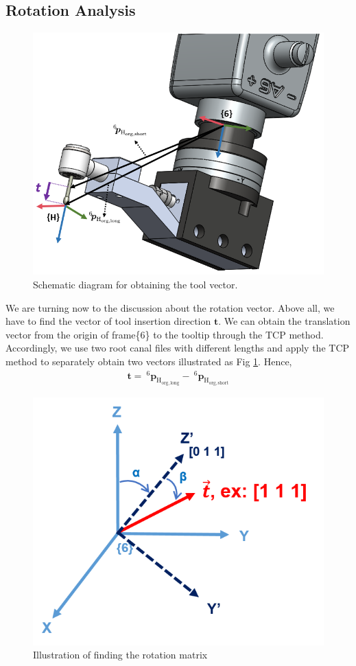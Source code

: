 \subsection{Rotation Analysis}
\label{sec:rot inf}
\begin{figure}[htbp]
\begin{center}
\includegraphics[width=0.7\linewidth]{Images/TCP2.png}
\caption{ 
Schematic diagram for obtaining the tool vector. 
}\label{fig:tcp2}
\end{center}
\end{figure}
\hspace*{6mm}We are turning now to the discussion about the rotation vector. Above all, we have to find the vector of tool insertion direction $\boldsymbol{t}$. We can obtain the translation vector from the origin of frame\{6\} to the tooltip through the TCP method. Accordingly, we use two root canal files with different lengths and apply the TCP method to separately obtain two vectors illustrated as Fig \ref{fig:tcp2}. Hence, 
\begin{equation}
\begin{split}
\boldsymbol{t} =\ ^\mathrm{6}\!\boldsymbol{p}_\mathrm{H_{org,long}} -\ ^\mathrm{6}\!\boldsymbol{p}_\mathrm{H_{org,short}}
\end{split}
\end{equation}
\begin{figure}[H]
\begin{center}
\includegraphics[width=0.6\linewidth]{Images/rot_inf.png}
\caption{
Illustration of finding the rotation matrix
}\label{fig:rot_inf}
\end{center}
\end{figure} 
